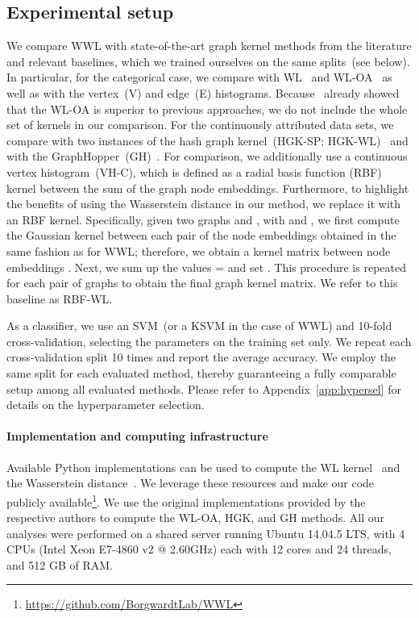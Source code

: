 \documentclass{article}
\begin{document}
\subsection{Experimental setup}
\label{sec:expsetup}
We compare WWL with state-of-the-art graph kernel methods from the literature and relevant baselines, which we trained ourselves on the same splits~(see below). In particular, for the categorical case, we compare with WL~\citep{shervashidze2009FastSK} and WL-OA~\citep{kriege2016oa} as well as with the vertex~(V) and edge~(E) histograms. Because~\citep{kriege2016oa} already showed that the WL-OA is superior to previous approaches, we do not include the whole set of kernels in our comparison. For the continuously attributed data sets, we compare with two instances of the hash graph kernel~(HGK-SP; HGK-WL)~\citep{morris2016faster} and with the GraphHopper~(GH)~\citep{feragen2013scalable}. For comparison, we additionally use a continuous vertex histogram~(VH-C), which is defined as a radial basis function (RBF) kernel between the sum of the graph node embeddings. Furthermore,
to highlight the benefits of using the Wasserstein distance in our method, we replace it with an RBF kernel. Specifically, given two graphs  and , with  and , we first compute the Gaussian kernel between each pair of the node embeddings obtained in the same fashion as for WWL; therefore, we obtain a kernel matrix between node embeddings . Next, we sum up the values  =  and set . This procedure is repeated for each pair of graphs to obtain the final graph kernel matrix. We refer to this baseline as RBF-WL.

As a classifier, we use an SVM~(or a KSVM in the case of WWL) and 10-fold cross-validation, selecting the parameters on the training set only. We repeat each cross-validation split 10 times and report the average accuracy. We employ the same split for each evaluated method, thereby guaranteeing a fully comparable setup among all evaluated methods. Please refer to Appendix~\ref{app:hypersel} for details on the hyperparameter selection.

\paragraph{Implementation and computing infrastructure}
Available Python implementations can be used to compute the WL kernel~\citep{sugiyama2018graphker} and the Wasserstein distance~\citep{flamary2017pot}. 
We leverage these resources and make our code publicly available\footnote{\href{https://github.com/BorgwardtLab/WWL}{https://github.com/BorgwardtLab/WWL}}. We use the original implementations provided by the respective authors to compute the WL-OA, HGK, and GH methods.
All our analyses were performed on a shared server running Ubuntu 14.04.5 LTS, with 4 CPUs (Intel Xeon E7-4860 v2 @ 2.60GHz) each with 12 cores and 24 threads, and 512 GB of RAM.
\end{document}
